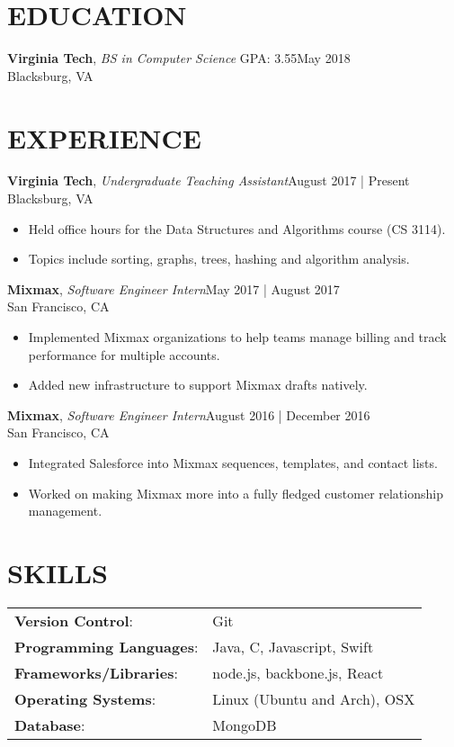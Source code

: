 \documentclass[line,margin]{res}
\begin{document}
\address{vincentl@vt.edu | (703) 992-5598 | github.com/vinnyoodles}
\begin{resume}
	\vspace{-5mm}
	\section{EDUCATION}
	\textbf{Virginia Tech}, {\sl BS in Computer Science} GPA: 3.55\hfill May 2018\\Blacksburg, VA
	\section{EXPERIENCE}
	\textbf{Virginia Tech}, {\sl Undergraduate Teaching Assistant}\hfill August 2017 | Present\\Blacksburg, VA\\\begin{itemize} \itemsep 3pt
	\item Held office hours for the Data Structures and Algorithms course (CS 3114).
	\item Topics include sorting, graphs, trees, hashing and algorithm analysis.
	\end{itemize}
	\textbf{Mixmax}, {\sl Software Engineer Intern}\hfill May 2017 | August 2017\\San Francisco, CA\\\begin{itemize} \itemsep 3pt
	\item Implemented Mixmax organizations to help teams manage billing and track performance for multiple accounts.
	\item Added new infrastructure to support Mixmax drafts natively.
	\end{itemize}
	\textbf{Mixmax}, {\sl Software Engineer Intern}\hfill August 2016 | December 2016\\San Francisco, CA\\\begin{itemize} \itemsep 3pt
	\item Integrated Salesforce into Mixmax sequences, templates, and contact lists.
	\item Worked on making Mixmax more into a fully fledged customer relationship management.
	\end{itemize}
	\section{SKILLS}
	\begin{tabular}{@{}ll}
		\textbf{Version Control}:       & Git                          \\
		\textbf{Programming Languages}: & Java, C, Javascript, Swift   \\
		\textbf{Frameworks/Libraries}:  & node.js, backbone.js, React  \\
		\textbf{Operating Systems}:     & Linux (Ubuntu and Arch), OSX \\
		\textbf{Database}:              & MongoDB                      \\
	\end{tabular}

\end{resume}
\end{document}
